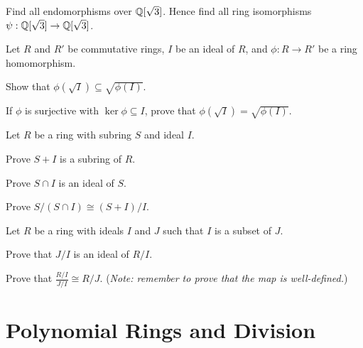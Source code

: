 \begin{problem}
    Find all endomorphisms over $\mathbb{Q}[\sqrt3]$.\newline
    Hence find all ring isomorphisms $\psi: \mathbb{Q}[\sqrt3] \to \mathbb{Q}[\sqrt3]$.
\end{problem}

\begin{problem}
    Let $R$ and $R'$ be commutative rings, $I$ be an ideal of $R$, and $\phi: R\to R'$ be a ring homomorphism.
    \begin{partquestions}{\roman*}
        \item Show that $\phi(\sqrt I) \subseteq \sqrt{\phi(I)}$.
        \item If $\phi$ is surjective with $\ker\phi \subseteq I$, prove that $\phi(\sqrt I) = \sqrt{\phi(I)}$.
    \end{partquestions}
\end{problem}

\begin{problem}\label{problem-ring-isomorphism-2}
    Let $R$ be a ring with subring $S$ and ideal $I$.
    \begin{partquestions}{\roman*}
        \item Prove $S+I$ is a subring of $R$.
        \item Prove $S \cap I$ is an ideal of $S$.
        \item Prove $S/(S\cap I)\cong (S+I)/I$.
    \end{partquestions}
\end{problem}

\begin{problem}\label{problem-ring-isomorphism-3}
    Let $R$ be a ring with ideals $I$ and $J$ such that $I$ is a subset of $J$.
    \begin{partquestions}{\roman*}
        \item Prove that $J/I$ is an ideal of $R/I$.
        \item Prove that $\frac{R/I}{J/I} \cong R/J$.\newline
        (\textit{Note: remember to prove that the map is well-defined.})
    \end{partquestions}
\end{problem}

\chapter{Polynomial Rings and Division}


